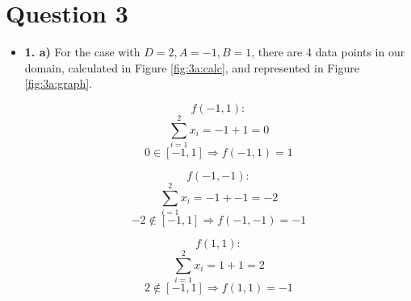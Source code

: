 \documentclass[12pt]{article}
\begin{document}
\section*{Question 3}
\begin{itemize}
    \item \textbf{1. a)} For the case with $D=2, A=-1, B=1$, there are 4 data points in our domain, calculated in Figure \ref{fig:3a:calc}, and represented in Figure \ref{fig:3a:graph}.

        \begin{figure}[H]
            \begin{minipage}{0.5\linewidth}
                \begin{equation*}
                    f(-1, 1):
                \end{equation*}
                \begin{equation*}
                    \sum_{i=1}^{2} x_i = -1 + 1 = 0
                \end{equation*}
                \begin{equation*}
                    0 \in [-1, 1] \Rightarrow f(-1, 1) = 1
                \end{equation*}

                \begin{equation*}
                    f(-1, -1):
                \end{equation*}
                \begin{equation*}
                    \sum_{i=1}^{2} x_i = -1 + -1 = -2
                \end{equation*}
                \begin{equation*}
                    -2 \notin [-1, 1] \Rightarrow f(-1, -1) = -1
                \end{equation*}
            \end{minipage}
            \begin{minipage}{0.5\linewidth}
                \begin{equation*}
                    f(1, 1):
                \end{equation*}
                \begin{equation*}
                    \sum_{i=1}^{2} x_i = 1 + 1 = 2
                \end{equation*}
                \begin{equation*}
                    2 \notin [-1, 1] \Rightarrow f(1, 1) = -1
                \end{equation*}


\end{minipage}
\end{figure}
\end{itemize}
\end{document}
